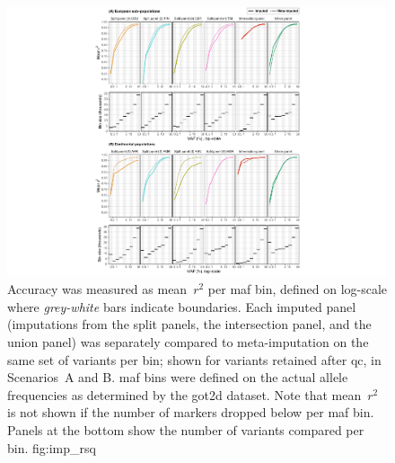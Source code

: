 

\begin{figure}[p]
\includegraphics[width=\textwidth]{./img/ch2/accuracy_imp_maf_rsq}
{Accuracy was measured as mean~$r^2$ per \gls{maf} bin, defined on log-scale where \emph{grey-white} bars indicate boundaries.
Each imputed panel (imputations from the  split panels, the intersection panel, and the union panel) was separately compared to meta-imputation on the same set of variants per bin; shown for variants retained after \gls{qc}, in Scenarios~A and B.
\Gls{maf} bins were defined on the actual allele frequencies as determined by the \gls{got2d} dataset.
Note that mean~$r^2$ is not shown if the number of markers dropped below  per \gls{maf} bin.
Panels at the bottom show the number of variants compared per bin.}
{fig:imp_rsq}
\end{figure}
